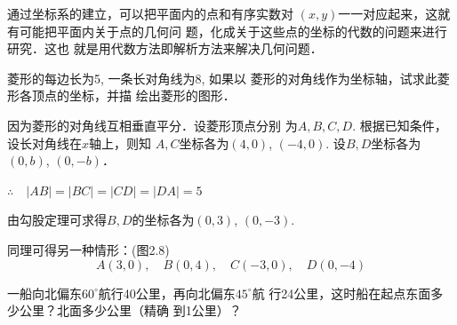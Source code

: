 通过坐标系的建立，可以把平面内的点和有序实数对
$(x,y)$一一对应起来，这就有可能把平面内关于点的几何问
题，化成关于这些点的坐标的代数的问题来进行研究．这也
就是用代数方法即解析方法来解决几何问题．

\begin{example}
    菱形的每边长为5, 一条长对角线为8, 如果以
    菱形的对角线作为坐标轴，试求此菱形各顶点的坐标，并描
    绘出菱形的图形．
\end{example}

\begin{solution}
    因为菱形的对角线互相垂直平分．设菱形顶点分别
为$A,B,C,D$. 根据已知条件，设长对角线在$x$轴上，则知
$A,C$坐标各为$(4,0)$, $(-4,0)$. 设$B,D$坐标各为$(0,b)$,
$(0,-b)$．

$\therefore\quad |AB|=|BC|=|CD|=|DA|=5$

由勾股定理可求得$B,D$的坐标各为$(0,3)$, $(0,-3)$.

同理可得另一种情形：(图2.8)
\[A(3,0),\quad B(0,4),\quad C(-3,0),\quad D(0,-4)\]
\begin{figure}[htp]
    \centering
    \caption{}
\end{figure}

\end{solution}

\begin{example}
  一船向北偏东$60^{\circ}$航行40公里，再向北偏东$45^{\circ}$航
行24公里，这时船在起点东面多少公里？北面多少公里（精确
到1公里）？  
\end{example}

